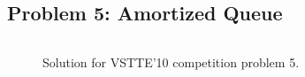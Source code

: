 \subsection{Problem 5: Amortized Queue}

\begin{figure}
  \centering
\begin{verbatim}
\end{verbatim}
\hrulefill
  \caption{Solution for VSTTE'10 competition problem 5.}
  \label{fig:AQueue}
\end{figure}


